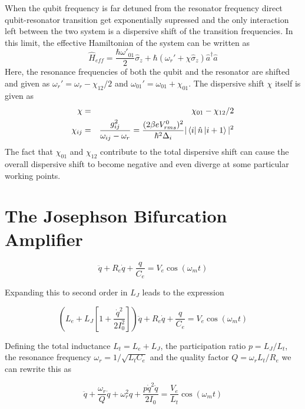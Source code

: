When the qubit frequency is far detuned from the resonator frequency direct qubit-resonator transition get exponentially supressed and the only interaction left between the two system is a dispersive shift of the transition frequencies. In this limit, the effective Hamiltonian of the system can be written as\citep{blais_cavity_2004,koch_charge-insensitive_2007}
\begin{equation}
\hat{H}_{eff} = \frac{\hbar \omega'_{01}}{2}\hat{\sigma}_z+\hbar(\omega_r' +\chi \hat{\sigma}_z)\hat{a}^\dagger \hat{a}
\end{equation}
Here, the resonance frequencies of both the qubit and the resonator are shifted and given as $\omega_r' = \omega_r-\chi_{12}/2$ and $\omega_{01}' = \omega_{01}+\chi_{01}$. The dispersive shift $\chi$ itself is given as
\begin{eqnarray}
\chi & = & \chi_{01}-\chi_{12}/2 \\
\chi_{ij} & = & \frac{g_{ij}^2}{\omega_{ij}-\omega_r} = \frac{(2\beta e V_{rms}^0)^2}{\hbar^2 \Delta_i}|\left< i \right|\hat{n}\left| i+1 \right>|^2
\end{eqnarray}
The fact that $\chi_{01}$ and $\chi_{12}$ contribute to the total dispersive shift can cause the overall dispersive shift to become negative and even diverge at some particular working points.

\section{The Josephson Bifurcation Amplifier}

\citep{palacios-laloy_superconducting_2010}

\begin{equation}
[L_e+L_J (i)]\ddot{q}+R_e \dot{q}+\frac{q}{C_e} = V_e \cos{\left(\omega_m t\right)}
\end{equation}

Expanding this to second order in $L_J$ leads to the expression

\begin{equation}
\left(L_e+L_J\left[1+\frac{\dot{q}^2}{2 I_0^2}\right]\right)\ddot{q}+R_e \dot{q}+\frac{q}{C_e} = V_e \cos{\left( \omega_m t\right)}
\end{equation}

Defining the total inductance $L_t = L_e+L_J$, the participation ratio $p=L_J/L_t$, the resonance frequency $\omega_r = 1/\sqrt{L_t C_e}$ and the quality factor $Q = \omega_r L_t / R_e$ we can rewrite this as

\begin{equation}
\ddot{q}+\frac{\omega_r}{Q}\dot{q}+\omega_r^2 q + \frac{p \dot{q}^2 \ddot{q}}{2 I_0} = \frac{V_e}{L_t}\cos{\left(\omega_m t \right)}
\end{equation}
